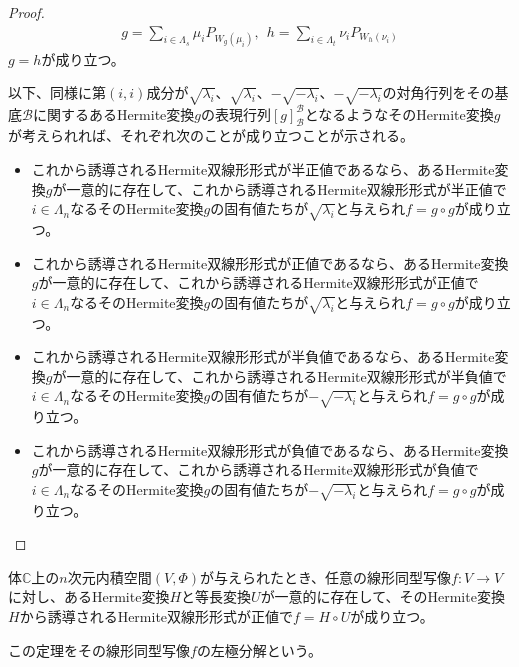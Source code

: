 \documentclass[dvipdfmx]{jsarticle}
\begin{document}
\begin{proof}
\begin{align*}
g = \sum_{i \in \varLambda_{s}} {\mu_{i}P_{W_{g}\left( \mu_{i} \right)}},\ \ h = \sum_{i \in \varLambda_{t}} {\nu_{i}P_{W_{h}\left( \nu_{i} \right)}}
\end{align*}
$g = h$が成り立つ。\par
以下、同様に第$(i,i)$成分が$\sqrt{\lambda_{i}}$、$\sqrt{\lambda_{i}}$、$- \sqrt{- \lambda_{i}}$、$- \sqrt{- \lambda_{i}}$の対角行列をその基底$\mathcal{B}$に関するあるHermite変換$g$の表現行列$[ g]_{\mathcal{B}}^{\mathcal{B}}$となるようなそのHermite変換$g$が考えられれば、それぞれ次のことが成り立つことが示される。
\begin{itemize}
\item
  これから誘導されるHermite双線形形式が半正値であるなら、あるHermite変換$g$が一意的に存在して、これから誘導されるHermite双線形形式が半正値で$i \in \varLambda_{n}$なるそのHermite変換$g$の固有値たちが$\sqrt{\lambda_{i}}$と与えられ$f = g \circ g$が成り立つ。
\item
  これから誘導されるHermite双線形形式が正値であるなら、あるHermite変換$g$が一意的に存在して、これから誘導されるHermite双線形形式が正値で$i \in \varLambda_{n}$なるそのHermite変換$g$の固有値たちが$\sqrt{\lambda_{i}}$と与えられ$f = g \circ g$が成り立つ。
\item
  これから誘導されるHermite双線形形式が半負値であるなら、あるHermite変換$g$が一意的に存在して、これから誘導されるHermite双線形形式が半負値で$i \in \varLambda_{n}$なるそのHermite変換$g$の固有値たちが$- \sqrt{- \lambda_{i}}$と与えられ$f = g \circ g$が成り立つ。
\item
  これから誘導されるHermite双線形形式が負値であるなら、あるHermite変換$g$が一意的に存在して、これから誘導されるHermite双線形形式が負値で$i \in \varLambda_{n}$なるそのHermite変換$g$の固有値たちが$- \sqrt{- \lambda_{i}}$と与えられ$f = g \circ g$が成り立つ。
\end{itemize}
\end{proof}
\begin{thm}[左極分解]\label{2.3.11.3}
体$\mathbb{C}$上の$n$次元内積空間$(V,\varPhi)$が与えられたとき、任意の線形同型写像$f:V \rightarrow V$に対し、あるHermite変換$H$と等長変換$U$が一意的に存在して、そのHermite変換$H$から誘導されるHermite双線形形式が正値で$f = H \circ U$が成り立つ。\par
この定理をその線形同型写像$f$の左極分解という。
\end{thm}
\end{document}
